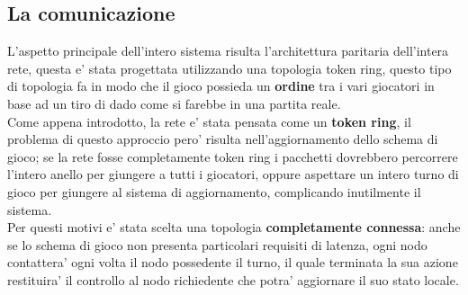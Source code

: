 \subsection{La comunicazione}
L'aspetto principale dell'intero sistema risulta l'architettura paritaria
dell'intera rete, questa e' stata progettata utilizzando una topologia token
ring, questo tipo di topologia fa in modo che il gioco possieda un
\textbf{ordine} tra i vari giocatori in base ad un tiro di dado come si farebbe
in una partita reale.\\
Come appena introdotto, la rete e' stata pensata come un \textbf{token ring}, il
problema di questo approccio pero' risulta nell'aggiornamento dello schema di
gioco; se la rete fosse completamente token ring i pacchetti dovrebbero
percorrere l'intero anello per giungere a tutti i giocatori, oppure aspettare
un intero turno di gioco per giungere al sistema di aggiornamento, complicando
inutilmente il sistema.\\
Per questi motivi e' stata scelta una topologia \textbf{completamente connessa}: anche se lo
schema di gioco non presenta particolari requisiti di latenza, ogni nodo
contattera' ogni volta il nodo possedente il turno, il quale terminata la sua
azione restituira' il controllo al nodo richiedente che potra' aggiornare il suo
stato locale.\\


